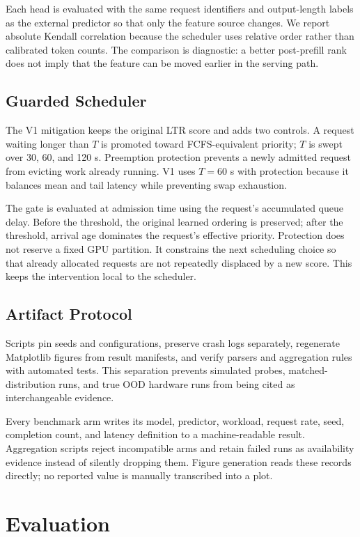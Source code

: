\documentclass[conference]{IEEEtran}
\begin{document}
Each head is evaluated with the same request identifiers and output-length labels as the external predictor so that only the feature source changes. We report absolute Kendall correlation because the scheduler uses relative order rather than calibrated token counts. The comparison is diagnostic: a better post-prefill rank does not imply that the feature can be moved earlier in the serving path.

\subsection{Guarded Scheduler}
The V1 mitigation keeps the original LTR score and adds two controls. A request waiting longer than $T$ is promoted toward FCFS-equivalent priority; $T$ is swept over 30, 60, and 120 s. Preemption protection prevents a newly admitted request from evicting work already running. V1 uses $T=60$ s with protection because it balances mean and tail latency while preventing swap exhaustion.

The gate is evaluated at admission time using the request's accumulated queue delay. Before the threshold, the original learned ordering is preserved; after the threshold, arrival age dominates the request's effective priority. Protection does not reserve a fixed GPU partition. It constrains the next scheduling choice so that already allocated requests are not repeatedly displaced by a new score. This keeps the intervention local to the scheduler.

\subsection{Artifact Protocol}
Scripts pin seeds and configurations, preserve crash logs separately, regenerate Matplotlib \cite{hunter2007matplotlib} figures from result manifests, and verify parsers and aggregation rules with automated tests. This separation prevents simulated probes, matched-distribution runs, and true OOD hardware runs from being cited as interchangeable evidence.

Every benchmark arm writes its model, predictor, workload, request rate, seed, completion count, and latency definition to a machine-readable result. Aggregation scripts reject incompatible arms and retain failed runs as availability evidence instead of silently dropping them. Figure generation reads these records directly; no reported value is manually transcribed into a plot.

\section{Evaluation}
\end{document}
